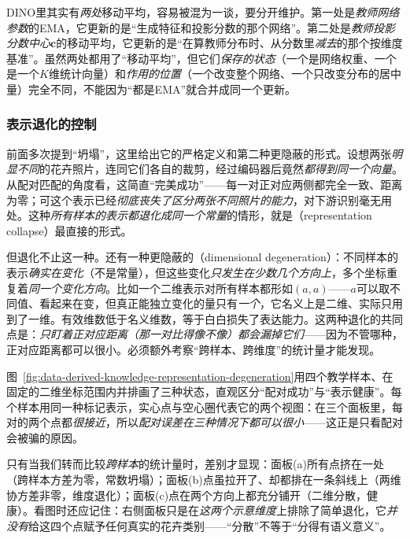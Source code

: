 DINO里其实有\emph{两处}移动平均，容易被混为一谈，要分开维护。第一处是\emph{教师网络参数}的EMA，它更新的是“生成特征和投影分数的那个网络”。第二处是\emph{教师投影分数中心}$\bm{c}$的移动平均，它更新的是“在算教师分布时、从分数里\emph{减去}的那个按维度基准”。虽然两处都用了“移动平均”，但它们\emph{保存的状态}（一个是网络权重、一个是一个$K$维统计向量）和\emph{作用的位置}（一个改变整个网络、一个只改变分布的居中量）完全不同，不能因为“都是EMA”就合并成同一个更新。

\subsubsection{表示退化的控制}
\label{sec:data-derived-knowledge-representation-degeneration}

前面多次提到“坍塌”，这里给出它的严格定义和第二种更隐蔽的形式。设想两张\emph{明显不同}的花卉照片，连同它们各自的裁剪，经过编码器后竟然\emph{都得到同一个向量}。从配对匹配的角度看，这简直“完美成功”——每一对正对应两侧都完全一致、距离为零；可这个表示已经\emph{彻底丧失了区分两张不同照片的能力}，对下游识别毫无用处。这种\emph{所有样本的表示都退化成同一个常量}的情形，就是（representation collapse）最直接的形式。

但退化不止这一种。还有一种更隐蔽的（dimensional degeneration）：不同样本的表示\emph{确实在变化}（不是常量），但这些变化\emph{只发生在少数几个方向上}，多个坐标重复着\emph{同一个变化方向}。比如一个二维表示对所有样本都形如$(a,a)$——$a$可以取不同值、看起来在变，但真正能独立变化的量只有\emph{一个}，它名义上是二维、实际只用到了一维。有效维数低于名义维数，等于白白损失了表达能力。这两种退化的共同点是：\emph{只盯着正对应距离（那一对比得像不像）都会漏掉它们}——因为不管哪种，正对应距离都可以很小。必须额外考察“跨样本、跨维度”的统计量才能发现。

图~\ref{fig:data-derived-knowledge-representation-degeneration}用四个教学样本、在固定的二维坐标范围内并排画了三种状态，直观区分“配对成功”与“表示健康”。每个样本用同一种标记表示，实心点与空心圈代表它的两个视图：在三个面板里，每对的两个点都\emph{很接近}，所以\emph{配对误差在三种情况下都可以很小}——这正是只看配对会被骗的原因。

只有当我们转而比较\emph{跨样本}的统计量时，差别才显现：面板(a)所有点挤在一处（跨样本方差为零，常数坍塌）；面板(b)点虽拉开了、却都排在一条斜线上（两维协方差非零，维度退化）；面板(c)点在两个方向上都充分铺开（二维分散，健康）。看图时还应记住：右侧面板只是在\emph{这两个示意维度}上排除了简单退化，它\emph{并没有}给这四个点赋予任何真实的花卉类别——“分散”不等于“分得有语义意义”。

